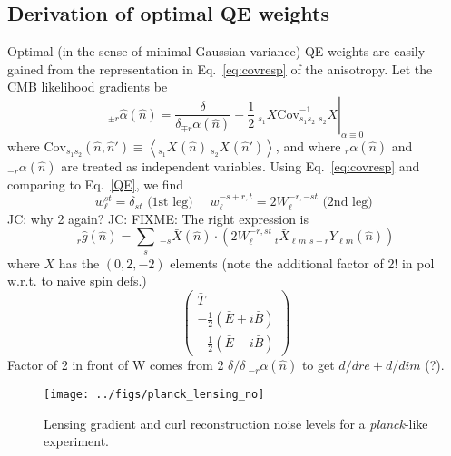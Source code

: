 \documentclass[reprint,prd, superscriptaddress, tightenlines, longbibliography, nofootinbib, eqsecnum, amsfonts, amsmath, floatfix, notitlepage, twocolumn]{revtex4-1}
\newcommand{\Cov}[0]{{\textrm{Cov}}}
\newcommand{\av}[1]{\left\langle #1 \right\rangle}
\newcommand{\JC}[1]{\color{red}JC: #1\color{black}}
\newcommand{\hn}[0]{\hat n}
\begin{document}
\subsection{Derivation of optimal QE weights}Optimal (in the sense of minimal Gaussian variance) QE weights are easily gained from the representation in Eq.~\ref{eq:covresp} of the anisotropy. Let the CMB likelihood gradients be
\begin{equation}
	_{\pm r}\hat \alpha(\hn) = \left.\frac{\delta }{\delta _{\mp r}\alpha (\hn)} -\frac 12\: _{s_1}X \Cov^{-1}_{s_1s_2} \:_{s_2}X \right|_{\alpha \equiv 0}
\end{equation}
where $\Cov_{s_1 s_2}(\hn, \hn') \equiv \av{_{s_1}X^{}(\hn) \:_{s_2}X^{}(\hn') }$, and where $_r\alpha(\hn)$ and $_{-r}\alpha(\hn)$ are treated as independent variables. 
Using Eq.~\eqref{eq:covresp} and comparing to Eq.~\eqref{QE}, we find
\begin{equation}\boxed{
	w_\ell^{st} = \delta_{st} \textrm{   (1st leg)  } \quad 	w_\ell^{-s + r, t} = 2W^{-r, -st}_\ell \textrm{   (2nd leg)  }}
\end{equation} \JC{why 2 again? }
\JC{FIXME: The right expression is 
\begin{equation}
	_{r}\hat g(\hn) = \sum_{s}\: _{-s}\bar X(\hn)\cdot \left( 2W_{\ell}^{-r, st} \:_{t}\bar X_{\ell m}\: _{s + r}Y_{\ell m}(\hn)\right)
\end{equation}
where $\bar X$ has the $(0, 2, -2)$ elements (note the additional factor of 2! in pol w.r.t. to naive spin defs.)
\begin{equation}
\begin{pmatrix}
	\bar T \\ -\frac 12 \left( \bar E + i \bar B \right) \\-\frac 12 \left( \bar E - i \bar B \right)
\end{pmatrix}	
\end{equation}
Factor of 2 in front of W comes from 2 $ \delta/  \delta\: _{-r}\alpha(\hn)$ to get $d/dre + d/dim$ (?).}
\begin{figure}
	\texttt{[image: ../figs/planck\_lensing\_no]}
	\caption{\label{fig:plancklensing_no}Lensing gradient and curl reconstruction noise levels for a \textit{planck}-like experiment.}
\end{figure}


\end{document}
